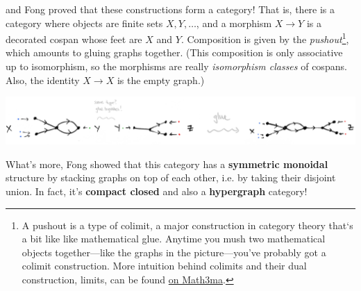 \documentclass{tufte-handout-tai}
\theoremstyle{plain}
\theoremstyle{definition}
\theoremstyle{remark}
\begin{document}
and Fong proved that these constructions form a category! That is, there is a category where objects are finite sets $X,Y,\ldots$, and a morphism $X\to Y$ is a decorated cospan whose feet are $X$ and $Y.$ Composition is given by the \textit{pushout}\footnote[][-1.18cm]{A pushout is a type of colimit, a major construction in category theory that`s a bit like like mathematical glue. Anytime you mush two mathematical objects together---like the graphs in the picture---you've probably got a colimit construction. More intuition behind colimits and their dual construction, limits, can be found \href{https://www.math3ma.com/blog/limits-and-colimits-part-1}{on Math3ma}.}, which amounts to gluing graphs together. (This composition is only associative up to isomorphism, so the morphisms are really \textit{isomorphism classes} of cospans. Also, the identity $X\to X$ is the empty graph.)
\begin{fullwidth}
\vspace{0.1cm}
\begin{center}
\includegraphics{glue.jpg}
\end{center}
\vspace{0.1cm}
\end{fullwidth}
What's more, Fong showed that this category has a \textbf{symmetric monoidal} structure by stacking graphs on top of each other, i.e. by taking their disjoint union. In fact, it's \textbf{compact closed} and also a \textbf{hypergraph} category!
\end{document}
